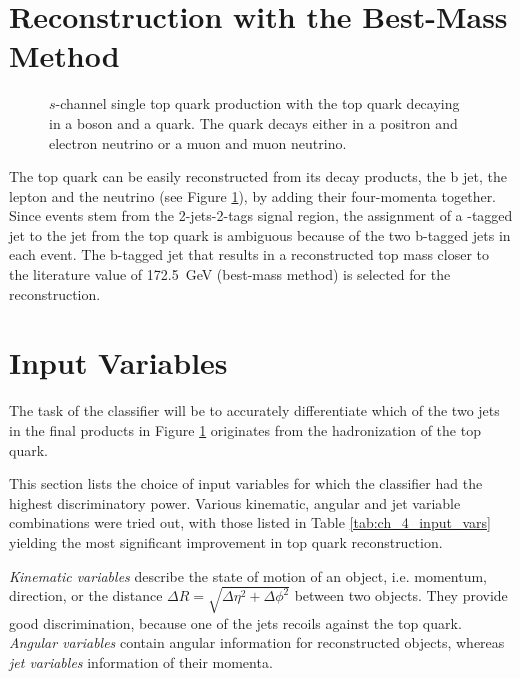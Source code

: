 \section{Reconstruction with the Best-Mass Method}
\label{sec:ch-4-best-mass}
\begin{figure}[h]
    \centering
    
    \caption{$s$-channel single top quark production with the top quark decaying in a \PWplus boson and a \Pbottom quark. The \PWplus quark decays either in a positron and electron neutrino or a muon and muon neutrino.}
    \label{fig:ch_4_single_top_reco}
\end{figure}
The top quark can be easily reconstructed from its decay products, the b jet, the lepton and the neutrino (see Figure \ref{fig:ch_4_single_top_reco}), by adding their four-momenta together. Since events stem from the 2-jets-2-tags signal region, the assignment of a \Pbottom-tagged jet to the \Pbottom jet from the top quark is ambiguous because of the two b-tagged jets in each event. The b-tagged jet that results in a reconstructed top mass closer to the literature value of \SI{172.5}{GeV} (best-mass method) is selected for the reconstruction.

\section{Input Variables}
\label{sec:ch-4-input-vars}
The task of the classifier will be to accurately differentiate which of the two \Pbottom jets in the final products in Figure \ref{fig:ch_4_single_top_reco} originates from the hadronization of the top quark.

This section lists the choice of input variables for which the classifier had the highest discriminatory power. Various kinematic, angular and jet variable combinations were tried out, with those listed in Table \ref{tab:ch_4_input_vars} yielding the most significant improvement in top quark reconstruction.

\emph{Kinematic variables} describe the state of motion of an object, i.e. momentum, direction, or the distance $\Delta R=\sqrt{\Delta \eta^2 + \Delta \phi^2}$ between two objects. They provide good discrimination, because one of the jets recoils against the top quark. \emph{Angular variables} contain angular information for reconstructed objects, whereas \emph{jet variables} information of their momenta.


